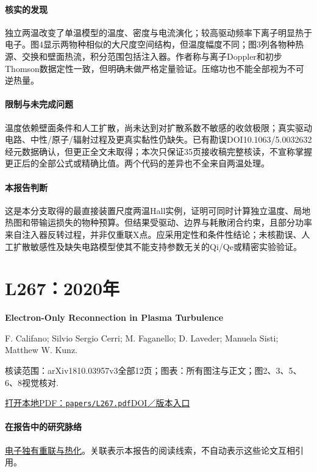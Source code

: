 \paragraph{核实的发现}独立两温改变了单温模型的温度、密度与电流演化；较高驱动频率下离子明显热于电子。图4显示两物种相似的大尺度空间结构，但温度幅度不同；图3列各物种热源、交换和壁面热流，积分范围包括注入器。作者称与离子Doppler和初步Thomson数据定性一致，但明确未做严格定量验证。压缩功也不能全部视为不可逆热量。

\paragraph{限制与未完成问题}温度依赖壁面条件和人工扩散，尚未达到对扩散系数不敏感的收敛极限；真实驱动电路、中性/原子/辐射过程及更真实黏性仍缺失。已有勘误DOI10.1063/5.0032632经元数据确认，但更正全文未取得；本次只保证35页接收稿完整核读，不宣称掌握更正后的全部公式或精确比值。两个代码的差异也不全来自两温处理。

\paragraph{本报告判断}这是本分支取得的最直接装置尺度两温Hall实例，证明可同时计算独立温度、局地热图和带输运损失的物种预算。但结果受驱动、边界与耗散闭合约束，且部分功率来自注入器反转过程，并非仅重联X点。应采用定性和条件性结论；未核勘误、人工扩散敏感性及缺失电路模型使其不能支持参数无关的Qi/Qe或精密实验验证。

\section{L267：2020年}\label{paper:L267}

\textbf{Electron-Only Reconnection in Plasma Turbulence}\citep{L267}\

F. Califano;  Silvio Sergio Cerri;  M. Faganello;  D. Laveder;  Manuela Sisti;  Matthew W. Kunz.

\textsf{核读范围：}arXiv1810.03957v3全部12页；\textsf{图表：}所有图注与正文；图2、3、5、6、8视觉核对.

\href{run:papers/L267.pdf}{打开本地PDF：\texttt{papers/L267.pdf}}\quad\href{https://doi.org/10.3389/fphy.2020.00317}{DOI／版本入口}

\paragraph{在报告中的研究脉络}\hyperref[story:energy]{电子独有重联与热化}。关联表示本报告的阅读线索，不自动表示这些论文互相引用。

